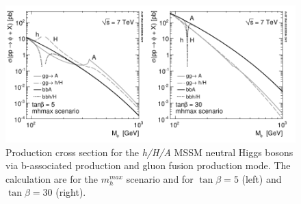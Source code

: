 \begin{figure}[tp]
     \begin{center}

            \includegraphics[width=\textwidth]{figure/xsec.png}

    \end{center}
    \caption{Production cross section for the \emph{h/H/A} MSSM neutral Higgs bosons via b-associated production and
	gluon fusion production mode. The calculation are for the $m_h^{max}$ scenario 
	and for $\tan \beta=5$ (left) and $\tan \beta=30$ (right).}
   \label{fig:xsec}
\end{figure}


